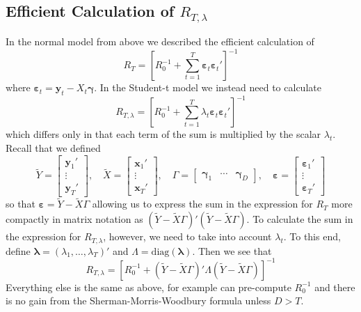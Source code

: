 \documentclass[12pt]{article}
\begin{document}
\subsection{Efficient Calculation of $R_{T,\lambda}$}
In the normal model from above we described the efficient calculation of
\begin{equation*}
  R_T = \left[ R_0^{-1} + \sum_{t=1}^T \boldsymbol{\varepsilon}_t \boldsymbol{\varepsilon}_t' \right]^{-1}
\end{equation*}
where $\boldsymbol{\varepsilon}_t = \mathbf{y}_t - X_t \boldsymbol{\gamma}$.
In the Student-t model we instead need to calculate
\begin{equation*}
  R_{T,\lambda} = \left[ R_0^{-1} + \sum_{t=1}^T \lambda_t \boldsymbol{\varepsilon}_t \boldsymbol{\varepsilon}_t' \right]^{-1}
\end{equation*}
which differs only in that each term of the sum is multiplied by the scalar $\lambda_t$.
Recall that we defined
\begin{equation*}
  \widetilde{Y} = \left[
  \begin{array}{c}
    \mathbf{y}_1'\\
    \vdots \\
    \mathbf{y}_T'
  \end{array}
\right], \quad \widetilde{X} = \left[
\begin{array}{c}
  \mathbf{x}_{1}' \\
  \vdots \\
  \mathbf{x}_{T}' 
\end{array}
\right], \quad \Gamma = \left[
\begin{array}{ccc}
  \boldsymbol{\gamma}_1 & \cdots & \boldsymbol{\gamma}_D
\end{array}
\right], \quad \boldsymbol{\varepsilon} = \left[
\begin{array}{c}
  \boldsymbol{\varepsilon}_1' \\
  \vdots \\
  \boldsymbol{\varepsilon}_T'
\end{array}
\right]
\end{equation*}
so that $\boldsymbol{\varepsilon} = \widetilde{Y} - \widetilde{X} \Gamma$ allowing us to express the sum in the expression for $R_T$ more compactly in matrix notation as $\left( \widetilde{Y} - \widetilde{X}\Gamma \right)'\left( \widetilde{Y} - \widetilde{X}\Gamma \right)$.
To calculate the sum in the expression for $R_{T,\lambda}$, however, we need to take into account $\lambda_t$.
To this end, define $\boldsymbol{\lambda} = \left( \lambda_1, \dots, \lambda_T \right)'$ and $\Lambda = \mbox{diag}(\boldsymbol{\lambda})$.
Then we see that
\begin{equation*}
  R_{T,\lambda} = \left[ R_0^{-1} +  \left( \widetilde{Y} - \widetilde{X}\Gamma \right)' \Lambda \left( \widetilde{Y} - \widetilde{X}\Gamma \right)\right]^{-1}
\end{equation*}
Everything else is the same as above, for example can pre-compute $R_{0}^{-1}$ and there is no gain from the Sherman-Morris-Woodbury formula unless $D>T$.
\end{document}
